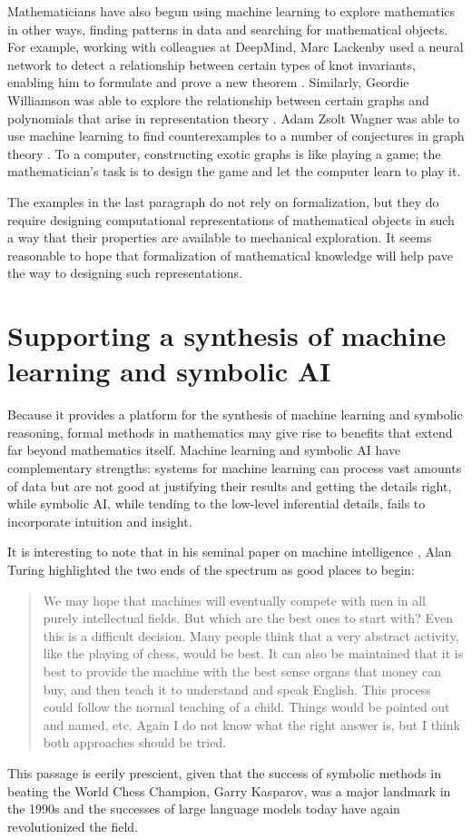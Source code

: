 \documentclass[12pt]{amsart}
\theoremstyle{definition}
\theoremstyle{remark}
\numberwithin{equation}{section}
\begin{document}
Mathematicians have also begun using machine learning to explore mathematics in other ways, finding patterns in data and searching for mathematical objects. For example, working with colleagues at DeepMind, Marc Lackenby used a neural network to detect a relationship between certain types of knot invariants, enabling him to formulate and prove a new theorem \cite{davies:et:al:21}. Similarly, Geordie Williamson was able to explore the relationship between certain graphs and polynomials that arise in representation theory \cite{davies:et:al:21}. Adam Zsolt Wagner was able to use machine learning to find counterexamples to a number of conjectures in graph theory \cite{wagner:21}. To a computer, constructing exotic graphs is like playing a game; the mathematician's task is to design the game and let the computer learn to play it.

The examples in the last paragraph do not rely on formalization, but they do require designing computational representations of mathematical objects in such a way that their properties are available to mechanical exploration. It seems reasonable to hope that formalization of mathematical knowledge will help pave the way to designing such representations.


\section{Supporting a synthesis of machine learning and symbolic AI}
\label{section:supporting:a:synthesis}

Because it provides a platform for the synthesis of machine learning and symbolic reasoning, formal methods in mathematics may give rise to benefits that extend far beyond mathematics itself. Machine learning and symbolic AI have complementary strengths: systems for machine learning can process vast amounts of data but are not good at justifying their results and getting the details right, while symbolic AI, while tending to the low-level inferential details, fails to incorporate intuition and insight.

It is interesting to note that in his seminal paper on machine intelligence \cite{turing:50}, Alan Turing highlighted the two ends of the spectrum as good places to begin:
\begin{quote}
We may hope that machines will eventually compete with men in all purely intellectual fields. But which are the best ones to start with? Even this is a difficult decision. Many people think that a very abstract activity, like the playing of chess, would be best. It can also be maintained that it is best to provide the machine with the best sense organs that money can buy, and then teach it to understand and speak English. This process could follow the normal teaching of a child. Things would be pointed out and named, etc. Again I do not know what the right answer is, but I think both approaches should be tried.
\end{quote}
This passage is eerily prescient, given that the success of symbolic methods in beating the World Chess Champion, Garry Kasparov, was a major landmark in the 1990s and the successes of large language models today have again revolutionized the field.
\end{document}
